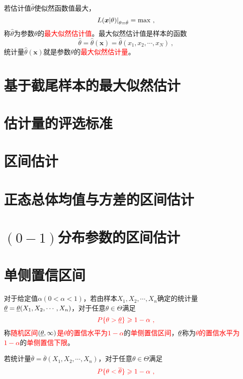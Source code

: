 \documentclass[12pt,a4paper]{article}
\renewcommand{\vec}[1]{\boldsymbol{#1}}
\begin{document}
若估计值$\hat{\theta}$使似然函数值最大，
\begin{equation}
L(\vec{x}|\theta)|_{\theta=\hat{\theta}} = \rm max ~,
\end{equation}
称$\hat{\theta}$为参数$\theta$的\textcolor{red}{最大似然估计值}。最大似然估计值是样本的函数
\begin{equation}
\hat{\theta} = \hat{\theta}(\vec{x}) = \hat{\theta}(x_1, x_2, \cdots, x_N) ~,
\end{equation}
统计量$\hat{\theta}(\vec{x})$就是参数$\theta$的\textcolor{red}{最大似然估计量}。

























\section{基于截尾样本的最大似然估计}


\section{估计量的评选标准}


\section{区间估计}



\section{正态总体均值与方差的区间估计}


\section{$(0-1)$分布参数的区间估计}


\section{单侧置信区间}
对于给定值$\alpha (0<\alpha<1)$，若由样本$X_1, X_2, \cdots, X_n$确定的统计量$\uline{\theta} = \uline{\theta}(X_1, X_2, \cdots, X_n)$，对于任意$\theta \in \Theta$满足
\begin{equation}
\color{red} P\{ \theta > \uline{\theta}\} \geqslant 1-\alpha ~,
\end{equation}
称\textcolor{red}{随机区间$(\uline{\theta}, \infty)$是$\theta$的置信水平为$1-\alpha$}的\textcolor{red}{单侧置信区间}，\textcolor{red}{$\uline{\theta}$}称为\textcolor{red}{$\theta$的置信水平为$1-\alpha$}的\textcolor{red}{单侧置信下限}。

若统计量$\overline{\theta} = \overline{\theta}(X_1, X_2, \cdots, X_n)$，对于任意$\theta \in \Theta$满足
\begin{equation}
\color{red} P\{ \theta < \overline{\theta}\} \geqslant 1-\alpha ~,
\end{equation}
\end{document}
